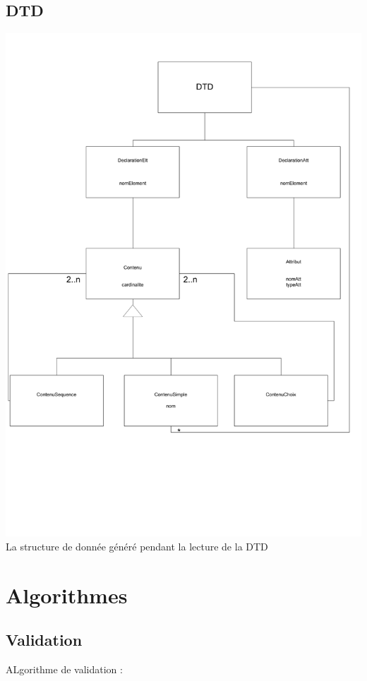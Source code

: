     \subsection{DTD}
        \includegraphics[width=\textwidth]{img/ClassesDTD.pdf}\\
        La structure de donnée généré pendant la lecture de la DTD
        
\section{Algorithmes}

    \subsection{Validation}
	
	ALgorithme de validation :
	
